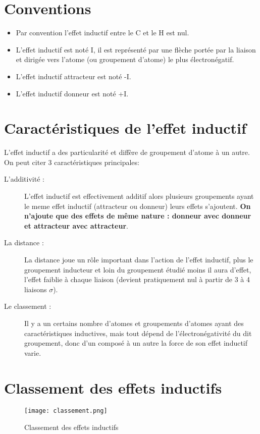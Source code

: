 \documentclass[a4paper, oneside]{book}
\begin{document}
\section{Conventions}
\begin{itemize}
    \item Par convention l'effet inductif entre le C et le H est nul.
    \item L'effet inductif est noté I, il est représenté par une flèche portée par la liaison et dirigée vers l'atome (ou groupement d'atome) le plus électronégatif.
    \item L'effet inductif attracteur est noté -I.
    \item L'effet inductif donneur est noté +I.
\end{itemize}
\section{Caractéristiques de l'effet inductif}
L'effet inductif a des particularité et diffère de groupement d'atome à un autre. On peut citer 3 caractéristiques principales:
\begin{description}
    \item[L'additivité :] L'effet inductif est effectivement additif alors plusieurs groupements ayant le meme effet inductif (attracteur ou donneur) leurs effets s'ajoutent. \textbf{On n'ajoute que des effets de même nature : donneur avec donneur et attracteur avec attracteur}.
    \item[La distance :] La distance joue un rôle important dans l'action de l'effet inductif, plus le groupement inducteur et loin du groupement étudié moins il aura d'effet, l'effet faiblie à chaque liaison (devient pratiquement nul à partir de 3 à 4 liaisons $\sigma$).
    \item[Le classement :] Il y a un certains nombre d'atomes et groupements d'atomes ayant des caractéristiques inductives, mais tout dépend de l'électronégativité du dit groupement, donc d'un composé à un autre la force de son effet inductif varie.
\end{description}
\section{Classement des effets inductifs}
\begin{figure}[!h]
    \centering
    \texttt{[image: classement.png]}
    \caption{Classement des effets inductifs}
    \label{fig:my_label}
\end{figure}
\end{document}

